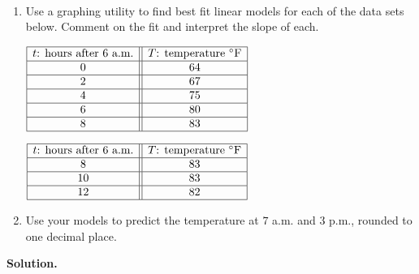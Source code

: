 \documentclass{ximera}
\begin{document}
\begin{example} \label{timetempregressionex}  $~$
  
\begin{enumerate}
  
\item Use a graphing utility to find best fit linear models for each of the data sets below. Comment on the fit and interpret the slope of each.

\begin{center}
  
\begin{multicols}{2}
  
$\begin{array}{|c||c|}  \hline

 \text{$t$: hours after 6 a.m.}  & \text{$T$: temperature $^{\circ}$F} \\ \hline
 0 & 64  \\  \hline
 2 & 67  \\  \hline
 4 &  75  \\  \hline
 6 &  80 \\  \hline
 8 & 83  \\  \hline

\end{array}$
  

	
$\begin{array}{|c||c|}  \hline

 \text{$t$: hours after 6 a.m.}  & \text{$T$: temperature $^{\circ}$F} \\ \hline

 8 & 83  \\  \hline
 10 &  83 \\  \hline
 12 & 82  \\  \hline

\end{array}$ 
  
\end{multicols}
  
\end{center}

\item  Use your models to predict the temperature at $7$ a.m. and $3$ p.m., rounded to one decimal place.
  
\end{enumerate}

\pagebreak

{\bf Solution.}
  
\begin{enumerate}
  

\end{enumerate}
\end{example}
\end{document}
